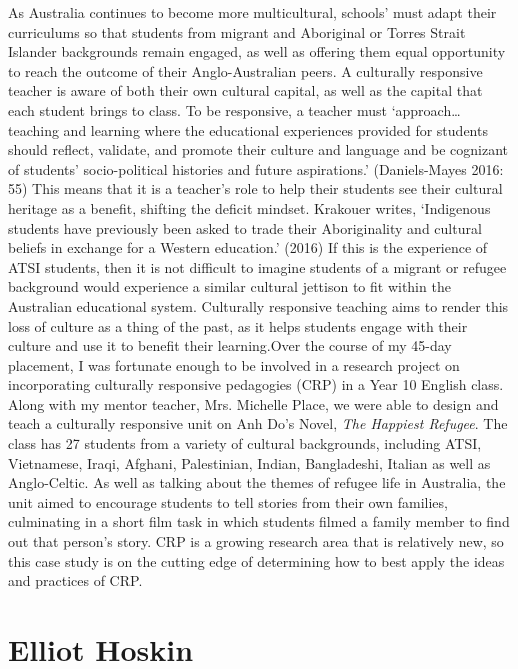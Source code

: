 \documentclass[twoside,14pt,a4paper,notitlepage]{memoir}
\begin{document}
As Australia continues to become more multicultural, schools’ must adapt their curriculums so that students from migrant and Aboriginal or Torres Strait Islander backgrounds remain engaged, as well as offering them equal opportunity to reach the outcome of their Anglo-Australian peers. A culturally responsive teacher is aware of both their own cultural capital, as well as the capital that each student brings to class. To be responsive, a teacher must ‘approach… teaching and learning where the educational experiences provided for students should reflect, validate, and promote their culture and language and be cognizant of students’ socio-political histories and future aspirations.’ (Daniels-Mayes 2016: 55) This means that it is a teacher’s role to help their students see their cultural heritage as a benefit, shifting the deficit mindset. Krakouer writes, ‘Indigenous students have previously been asked to trade their Aboriginality and cultural beliefs in exchange for a Western education.’ (2016) If this is the experience of ATSI students, then it is not difficult to imagine students of a migrant or refugee background would experience a similar cultural jettison to fit within the Australian educational system. Culturally responsive teaching aims to render this loss of culture as a thing of the past, as it helps students engage with their culture and use it to benefit their learning.Over the course of my 45-day placement, I was fortunate enough to be involved in a research project on incorporating culturally responsive pedagogies (CRP) in a Year 10 English class. Along with my mentor teacher, Mrs. Michelle Place, we were able to design and teach a culturally responsive unit on Anh Do’s Novel, \textit{The Happiest Refugee}. The class has 27 students from a variety of cultural backgrounds, including ATSI, Vietnamese, Iraqi, Afghani, Palestinian, Indian, Bangladeshi, Italian as well as Anglo-Celtic. As well as talking about the themes of refugee life in Australia, the unit aimed to encourage students to tell stories from their own families, culminating in a short film task in which students filmed a family member to find out that person’s story. CRP is a growing research area that is relatively new, so this case study is on the cutting edge of determining how to best apply the ideas and practices of CRP.

\section*{Elliot Hoskin}
\end{document}
